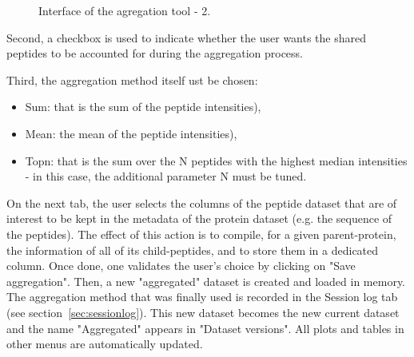\documentclass[12pt]{article}
\begin{document}
\begin {figure}
\centering
{}
\caption{Interface of the agregation tool - 2.}\label{fig:agreg2}
\end {figure}


Second, a checkbox is used to indicate whether the user wants the shared peptides to be accounted for during the aggregation process.

Third, the aggregation method itself ust be chosen: 
\begin{itemize}
\item Sum: that is the sum of the peptide intensities),
\item Mean: the mean of the peptide intensities),
\item Topn: that is the sum over the N peptides with the highest median intensities - in this case, the additional parameter N must be tuned.
\end{itemize}

On the next tab, the user selects the columns of the peptide dataset that are of interest to be kept in the metadata of the protein dataset (e.g. the sequence of the peptides). The effect of this action is to compile, for a given parent-protein, the information of all of its child-peptides, and to store them in a dedicated column. Once done, one validates the user's choice by clicking on "Save aggregation". Then, a new "aggregated" dataset is created and loaded in memory. The aggregation method that was finally used is recorded in the Session log tab (see section~\ref{sec:sessionlog}). This new dataset becomes the new current dataset and the name "Aggregated" appears in "Dataset versions". All plots and tables in other menus are automatically updated.
\end{document}
